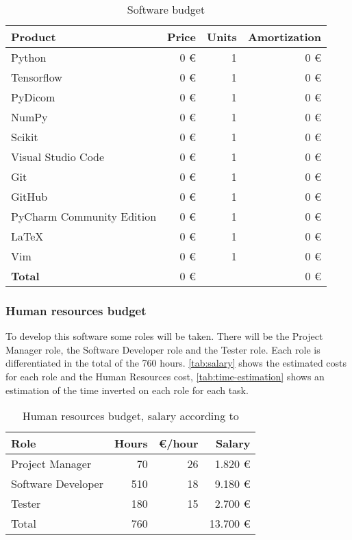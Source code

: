 \begin{table}[H]
  \centering
  \begin{tabular}{|l|r|r|r|}
    \hline
    \textbf{Product} & \textbf{Price} & \textbf{Units} & \textbf{Amortization} \\ \hline\hline

    Python & 0 € & 1 & 0 € \\ \hline
    Tensorflow & 0 € & 1 & 0 € \\ \hline
    PyDicom & 0 € & 1 & 0 € \\ \hline
    NumPy & 0 € & 1 & 0 € \\ \hline
    Scikit & 0 € & 1 & 0 € \\ \hline
    Visual Studio Code & 0 € & 1 & 0 € \\ \hline
    Git & 0 € & 1 & 0 € \\ \hline
    GitHub & 0 € & 1 & 0 € \\ \hline
    PyCharm Community Edition & 0 € & 1 & 0 € \\ \hline
    \LaTeX & 0 € & 1 & 0 € \\ \hline
    Vim & 0 € & 1 & 0 € \\ \hline

    \hline\hline
    \textbf{Total} & 0 € &  & 0  € \\ \hline
  \end{tabular}
  \caption{Software budget \label{tab:software-budget}}
\end{table}


\subsubsection{Human resources budget}

To develop this software some roles will be taken. There will be the Project Manager role,
the Software Developer role and the Tester role. Each role is differentiated in the total
of the 760 hours. \autoref{tab:salary} shows the estimated costs for each role and the
Human Resources cost, \autoref{tab:time-estimation} shows an estimation of the time 
inverted on each role for each task.

\begin{table}[H]
  \centering
  \begin{tabular}{|l|r|r|r|}
    \hline
    \textbf{Role} & \textbf{Hours} & \textbf{€/hour} & \textbf{Salary} \\ \hline\hline

    Project Manager & 70 & 26 & 1.820 € \\ \hline
    Software Developer & 510 & 18 & 9.180 € \\ \hline
    Tester & 180 & 15 & 2.700 € \\ \hline

    \hline\hline 
    Total & 760 & & 13.700 € \\
    \hline
  \end{tabular}

  \caption{Human resources budget, salary according to \cite{ine:salary} \label{tab:salary}}
\end{table}

